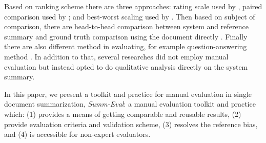 \documentclass[11pt,a4paper]{article}
\newcommand\shashi[1]{{\textcolor{blue}{#1}}}
\begin{document}
Based on ranking scheme there are three approaches: rating scale \citep{Likert1932} used by \citet{Kryscinski2018}, paired comparison \citep{Thurstone1994} used by \citet{Fan2018, Celikyilmaz2018}; and best-worst scaling \citep{Woodworth1991} used by \citet{Shashi2018}. Then based on subject of comparison, there are head-to-head comparison between system and reference summary \citep{Celikyilmaz2018} and ground truth comparison using the document directly \citep{Shashi2018, Kryscinski2018}. Finally there are also different method in evaluating, for example question-answering method \citep{Clarke2010, Shashi2018}. In addition to that, several researches \citep{Nallapati2016a, See2017, Gehrmann2018} did not employ manual evaluation but instead opted to do qualitative analysis directly on the system summary.

In this paper, we present a toolkit and practice for manual evaluation in single document summarization, \textit{Summ-Eval}: a manual evaluation toolkit and practice which: (1) provides a means of getting comparable and reusable results, (2) provide evaluation criteria and validation scheme, (3) resolves the reference bias, and (4) is accessible for non-expert evaluators.







\appendix
\end{document}
